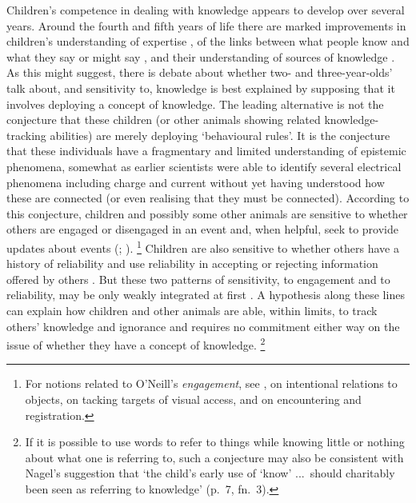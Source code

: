 \documentclass[11pt,a4paper]{extarticle}
\begin{document}
Children's competence in dealing with knowledge appears to develop over several years.
Around the fourth and fifth years of life there are marked improvements in 
children's understanding of expertise 
\citep{lutz_early_2002,sobel_children_2010},
of the links between what people know and what they say or might say \citep{Robinson:1994nw,Robinson:2010uq},
and their understanding of sources of knowledge \citep{ONeill:1992ct,ONeill:2001co,Robinson:2006vl}.
As this might suggest,
there is debate about whether two- and three-year-olds' talk about, and sensitivity to, knowledge is best explained by supposing that it involves deploying a concept of knowledge.
The leading alternative is not the conjecture that these children (or other animals showing related knowledge-tracking abilities) are merely deploying `behavioural rules'.
It is the conjecture that these individuals have a fragmentary and limited understanding of epistemic phenomena, somewhat as earlier scientists were able to identify several electrical phenomena including charge and current without yet having understood how these are connected (or even realising that they must be connected).
According to this conjecture, children and possibly some other animals are sensitive to whether others are engaged or disengaged in an event and, when helpful, seek to provide updates about events 
(\citealp[pp.\ 88-9]{ONeill:2005ff};
\citealp{viranyi_nonverbal_2005}).%
\footnote{
For notions related to O'Neill's \emph{engagement}, see 
\citet{Doherty:2006wz}, 
\citet{Gomez:2007fk} on intentional relations to objects, 
 \citet[p.\ 58]{Call:2005qe} on tacking targets of visual access,
and \citet{butterfill_minimal} on encountering and registration.
}
Children are also sensitive to whether others have a history of reliability and use reliability in accepting or rejecting information offered by others \citep{Koenig:2005rc,birch_three-_2008}.
But these two patterns of sensitivity, to engagement and to reliability, may be only weakly integrated at first \citep{nurmsoo_childrens_2009,nurmsoo_identifying_2009}.
A hypothesis along these lines can explain how children and other animals are able, within limits, to track others' knowledge and ignorance 
and requires no commitment either way on the issue of whether they have a concept of knowledge.%
\footnote{
If it is possible to use words to refer to things while  knowing little or nothing about what one is referring to,
such a conjecture may also be consistent with Nagel's suggestion that `the child's early use of `know' ...\ should charitably been seen as referring to knowledge' (p.\ 7, fn.\ 3).
}
\end{document}

